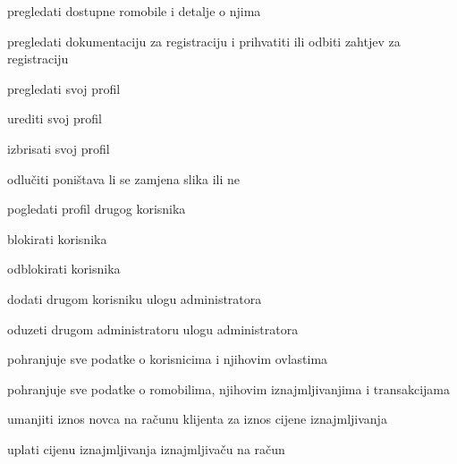 \begin{packed_enum}
\begin{packed_enum}
			\end{packed_enum}
			\item  {}
			
			\begin{packed_enum}
		
			\item pregledati dostupne romobile i detalje o njima
			\item pregledati dokumentaciju za registraciju i prihvatiti ili odbiti zahtjev za registraciju
			\item pregledati svoj profil
			\item urediti svoj profil
			\item izbrisati svoj profil
			\item odlučiti poništava li se zamjena slika ili ne
			\item pogledati profil drugog korisnika
			\item blokirati korisnika
			\item odblokirati korisnika
			\item dodati drugom korisniku ulogu administratora
			\item oduzeti drugom administratoru ulogu administratora
			
			
		
			
			\end{packed_enum}
			\item  {}

			\begin{packed_enum}
				
				\item pohranjuje sve podatke o korisnicima i njihovim ovlastima
				
				\item pohranjuje sve podatke o romobilima, njihovim iznajmljivanjima i transakcijama
				
				
				
			\end{packed_enum}
			
			\item  {}
			
			\begin{packed_enum}
				
			\item umanjiti iznos novca na računu klijenta za iznos cijene iznajmljivanja
			
			\item uplati cijenu iznajmljivanja iznajmljivaču na račun
			
			
			
			\end{packed_enum}
		\end{packed_enum}
			
